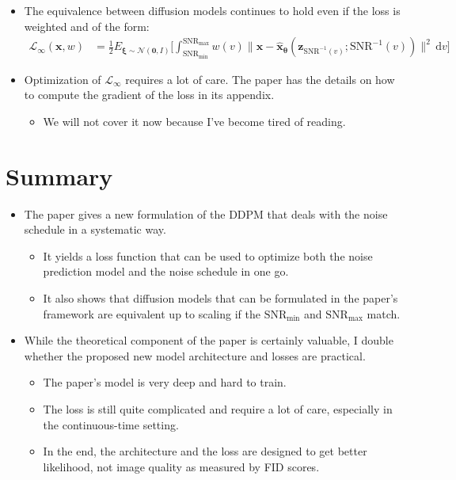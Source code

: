 \documentclass[10pt]{article}
\newcommand{\dee}{\mathrm{d}}
\newcommand{\ve}[1]{\mathbf{#1}}
\newcommand{\ves}[1]{\boldsymbol{#1}}
\newcommand{\mcal}[1]{\mathcal{#1}}
\newcommand{\SNR}{\mathrm{SNR}}
\begin{document}
\begin{itemize}
  \item The equivalence between diffusion models continues to hold even if the loss is weighted and of the form:
  \begin{align*}
  \mcal{L}_{\infty}(\ve{x}, w) &= \frac{1}{2} E_{\ves{\xi} \sim \mcal{N}(\ve{0},I)} \bigg[ \int_{\SNR_{\min}}^{\SNR_{\max}} w(v) \| \ve{x} - \hat{\ve{x}}_{\ves{\theta}}(\ve{z}_{\SNR^{-1}(v)}; \SNR^{-1}(v)) \|^2\, \dee v \bigg]
  \end{align*}

  \item Optimization of $\mcal{L}_{\infty}$ requires a lot of care. The paper has the details on how to compute the gradient of the loss in its appendix.
  \begin{itemize}
    \item We will not cover it now because I've become tired of reading.
  \end{itemize}
\end{itemize}

\section{Summary}

\begin{itemize}
  \item The paper gives a new formulation of the DDPM that deals with the noise schedule in a systematic way.
  \begin{itemize}
    \item It yields a loss function that can be used to optimize both the noise prediction model and the noise schedule in one go.
    
    \item It also shows that diffusion models that can be formulated in the paper's framework are equivalent up to scaling if the $\SNR_{\min}$ and $\SNR_{\max}$ match.
  \end{itemize}

  \item While the theoretical component of the paper is certainly valuable, I double whether the proposed new model architecture and losses are practical.
  \begin{itemize}
    \item The paper's model is very deep and hard to train.
    \item The loss is still quite complicated and require a lot of care, especially in the continuous-time setting.
    \item In the end, the architecture and the loss are designed to get better likelihood, not image quality as measured by FID scores.
  \end{itemize}
\end{itemize}
\end{document}
